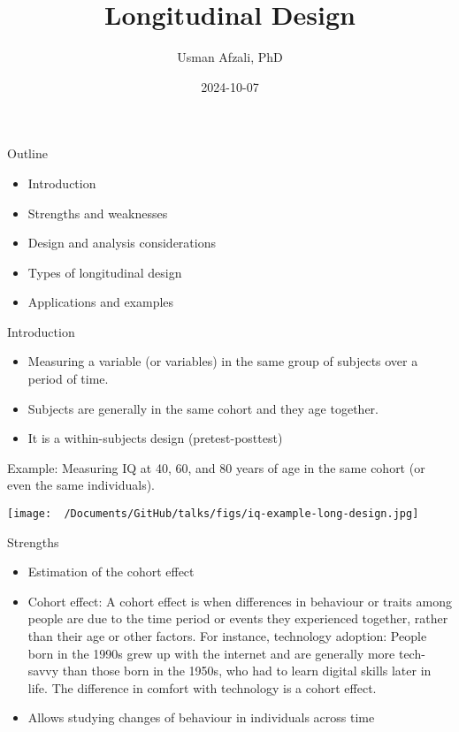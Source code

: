 \documentclass[
  ignorenonframetext,
  aspectratio=169,
]{beamer}
\title{Longitudinal Design}
\author{Usman Afzali, PhD}
\date{2024-10-07}
\providecommand{\tightlist}{%
  \setlength{\itemsep}{0pt}\setlength{\parskip}{0pt}}\usepackage{longtable,booktabs,array}
\begin{document}
\frame{\titlepage}

\begin{frame}{Outline}
\label{outline}
\begin{itemize}
\tightlist
\item
  Introduction
\item
  Strengths and weaknesses
\item
  Design and analysis considerations
\item
  Types of longitudinal design
\item
  Applications and examples
\end{itemize}
\end{frame}

\begin{frame}{Introduction}
\label{introduction}
\begin{itemize}[<+->]
\tightlist
\item
  Measuring a variable (or variables) in the same group of subjects over
  a period of time.
\item
  Subjects are generally in the same cohort and they age together.
\item
  It is a within-subjects design (pretest-posttest)
\end{itemize}
\end{frame}

\begin{frame}
Example: Measuring IQ at 40, 60, and 80 years of age in the same cohort
(or even the same individuals).

\begin{center}
\texttt{[image: ~/Documents/GitHub/talks/figs/iq-example-long-design.jpg]}
\end{center}
\end{frame}

\begin{frame}{Strengths}
\label{strengths}
\begin{itemize}[<+->]
\tightlist
\item
  Estimation of the cohort effect
\item
  Cohort effect: A cohort effect is when differences in behaviour or
  traits among people are due to the time period or events they
  experienced together, rather than their age or other factors. For
  instance, technology adoption: People born in the 1990s grew up with
  the internet and are generally more tech-savvy than those born in the
  1950s, who had to learn digital skills later in life. The difference
  in comfort with technology is a cohort effect.
\item
  Allows studying changes of behaviour in individuals across time
\end{itemize}
\end{frame}
\end{document}
